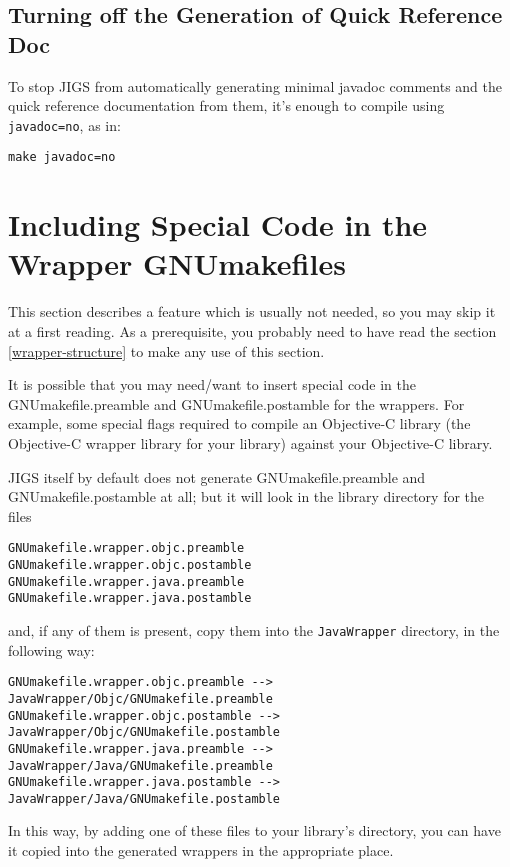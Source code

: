 \subsection{Turning off the Generation of Quick Reference Doc}

To stop JIGS from automatically generating minimal javadoc comments
and the quick reference documentation from them, it's enough to
compile using \texttt{javadoc=no}, as in:
\begin{verbatim}
make javadoc=no
\end{verbatim}

\section{Including Special Code in the Wrapper GNUmakefiles}\label{special-code-in-GNUmakefiles}

This section describes a feature which is usually not needed, so you
may skip it at a first reading.  As a prerequisite, you probably need
to have read the section \ref{wrapper-structure} to make any use of
this section.

It is possible that you may need/want to insert special code in the
GNUmakefile.preamble and GNUmakefile.postamble for the wrappers.  For
example, some special flags required to compile an Objective-C library
(the Objective-C wrapper library for your library) against your
Objective-C library.

JIGS itself by default does not generate GNUmakefile.preamble and
GNUmakefile.postamble at all; but it will look in the library
directory for the files 
\begin{verbatim}
GNUmakefile.wrapper.objc.preamble
GNUmakefile.wrapper.objc.postamble
GNUmakefile.wrapper.java.preamble
GNUmakefile.wrapper.java.postamble
\end{verbatim}
and, if any of them is present, copy them into the \texttt{JavaWrapper} 
directory, in the following way:
\begin{verbatim}
GNUmakefile.wrapper.objc.preamble --> JavaWrapper/Objc/GNUmakefile.preamble
GNUmakefile.wrapper.objc.postamble --> JavaWrapper/Objc/GNUmakefile.postamble
GNUmakefile.wrapper.java.preamble --> JavaWrapper/Java/GNUmakefile.preamble
GNUmakefile.wrapper.java.postamble --> JavaWrapper/Java/GNUmakefile.postamble
\end{verbatim}

In this way, by adding one of these files to your library's directory,
you can have it copied into the generated wrappers in the appropriate
place.

